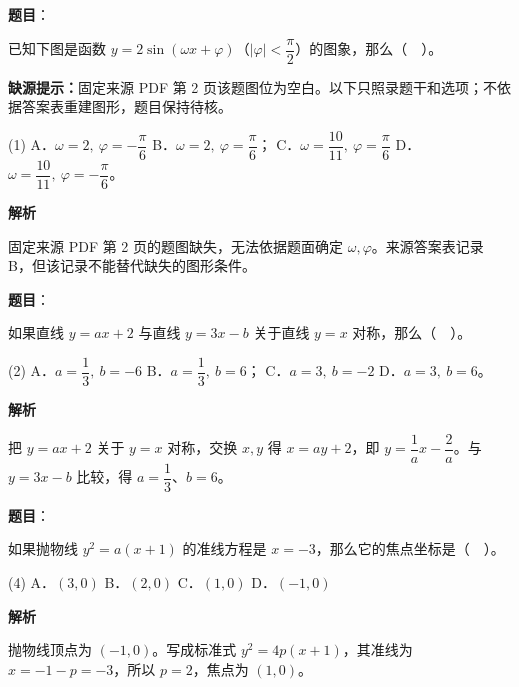 \begin{answer}

\textbf{题目}：

已知下图是函数 $y=2\sin(\omega x+\varphi)$（$|\varphi|<\dfrac\pi2$）的图象，那么（　）。

\begin{gktip}
\textbf{缺源提示：}固定来源 PDF 第 2 页该题图位为空白。以下只照录题干和选项；不依据答案表重建图形，题目保持待核。
\end{gktip}

\begin{gkopts}(1)
\task A．$\omega=2,\ \varphi=-\dfrac\pi6$
\task B．$\omega=2,\ \varphi=\dfrac\pi6$；
\task C．$\omega=\dfrac{10}{11},\ \varphi=\dfrac\pi6$
\task D．$\omega=\dfrac{10}{11},\ \varphi=-\dfrac\pi6$。
\end{gkopts}

\textbf{解析}

固定来源 PDF 第 2 页的题图缺失，无法依据题面确定 $\omega,\varphi$。来源答案表记录 B，但该记录不能替代缺失的图形条件。


\end{answer}
\begin{answer}

\textbf{题目}：

如果直线 $y=ax+2$ 与直线 $y=3x-b$ 关于直线 $y=x$ 对称，那么（　）。

\begin{gkopts}(2)
\task A．$a=\dfrac13,\ b=-6$
\task B．$a=\dfrac13,\ b=6$；
\task C．$a=3,\ b=-2$
\task D．$a=3,\ b=6$。
\end{gkopts}

\textbf{解析}

把 $y=ax+2$ 关于 $y=x$ 对称，交换 $x,y$ 得 $x=ay+2$，即 $y=\dfrac1a x-\dfrac2a$。与 $y=3x-b$ 比较，得 $a=\dfrac13$、$b=6$。


\end{answer}
\begin{answer}

\textbf{题目}：

如果抛物线 $y^2=a(x+1)$ 的准线方程是 $x=-3$，那么它的焦点坐标是（　）。

\begin{gkopts}(4)
\task A．$(3,0)$
\task B．$(2,0)$
\task C．$(1,0)$
\task D．$(-1,0)$
\end{gkopts}

\textbf{解析}

抛物线顶点为 $(-1,0)$。写成标准式 $y^2=4p(x+1)$，其准线为 $x=-1-p=-3$，所以 $p=2$，焦点为 $(1,0)$。


\end{answer}
